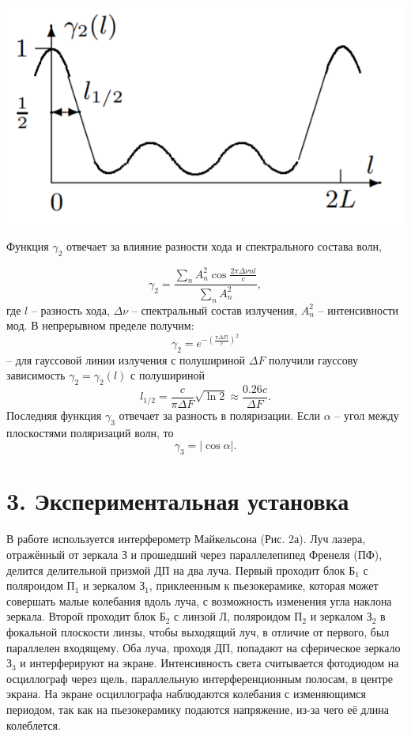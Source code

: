 \documentclass[a4paper,12pt]{report}
\begin{document}
\begin{center}
    \includegraphics[scale = 1]{1.png}
\end{center}

Функция $\gamma_2$ отвечает за влияние разности хода и спектрального состава волн,

$$
\gamma_2 = \dfrac{\sum\limits_n A^2_n \cos \frac{2\pi \Delta \nu n l}{c}}{\sum\limits_n A_n^2},
$$
где $l$ -- разность хода, $\Delta \nu$ -- спектральный состав излучения, $A_n^2$ -- интенсивности мод. В непрерывном пределе получим:
$$
\gamma_2 = e^{-\left(\frac{\pi \Delta F l}{c}\right)^2}
$$
-- для гауссовой линии излучения с полушириной $\Delta F$ получили гауссову зависимость $\gamma_2 = \gamma_2(l)$ с полушириной 
\begin{equation}
l_{1/2} = \dfrac{c}{\pi \Delta F}\sqrt{\ln 2} \approx \dfrac{0.26 c}{\Delta F}.
\end{equation}
Последняя функция $\gamma_3$ отвечает за разность в поляризации. Если $\alpha$ -- угол между плоскостями поляризаций волн, то
\begin{equation}
\gamma_3 = |\cos \alpha|.
\end{equation}
\section*{3. Экспериментальная установка}

В работе используется интерферометр Майкельсона (Рис. 2а). Луч лазера, отражённый от зеркала З и прошедший через параллелепипед Френеля (ПФ), делится делительной призмой ДП на два луча. Первый проходит блок $\text{Б}_1$ с поляроидом $\text{П}_1$ и зеркалом $\text{З}_1$, приклеенным к пьезокерамике, которая может совершать малые колебания вдоль луча, с возможность изменения угла наклона зеркала. Второй проходит блок $\text{Б}_2$ с линзой Л, поляроидом $\text{П}_2$ и зеркалом $\text{З}_2$ в фокальной плоскости линзы, чтобы выходящий луч, в отличие от первого, был параллелен входящему. Оба луча, проходя ДП, попадают на сферическое зеркало $\text{З}_3$ и интерферируют на экране. Интенсивность света считывается фотодиодом на осциллограф через щель, параллельную интерференционным полосам, в центре экрана. На экране осциллографа наблюдаются колебания с изменяющимся периодом, так как на пьезокерамику подаются напряжение, из-за чего её длина колеблется.
\end{document}
